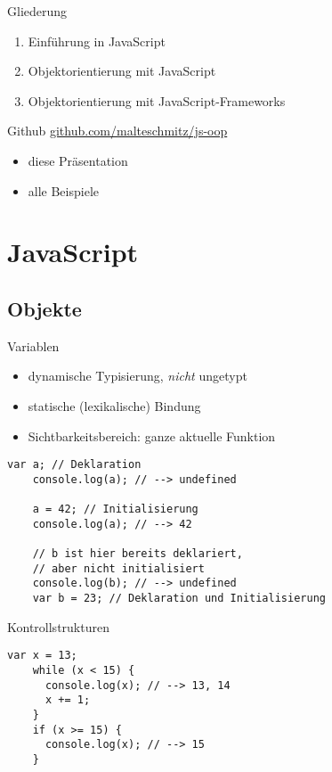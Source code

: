 \begin{frame}{Gliederung}
  \begin{enumerate}[{Teil} I]
    \item Einführung in JavaScript
    \item Objektorientierung mit JavaScript
    \item Objektorientierung mit JavaScript-Frameworks
  \end{enumerate}
\end{frame}

\begin{frame}{Github}
  \url{github.com/malteschmitz/js-oop}
  \begin{itemize}
    \item diese Präsentation
    \item alle Beispiele
  \end{itemize}
\end{frame}

\section{JavaScript}

\subsection{Objekte}

\begin{frame}[fragile]{Variablen}
  \begin{itemize}
    \item dynamische Typisierung, \emph{nicht} ungetypt
    \item statische (lexikalische) Bindung
    \item Sichtbarkeitsbereich: ganze aktuelle Funktion
  \end{itemize}
  
  \begin{lstlisting}[gobble=4]
    var a; // Deklaration
    console.log(a); // --> undefined
    
    a = 42; // Initialisierung
    console.log(a); // --> 42
    
    // b ist hier bereits deklariert,
    // aber nicht initialisiert
    console.log(b); // --> undefined
    var b = 23; // Deklaration und Initialisierung
  \end{lstlisting}  
\end{frame}

\begin{frame}[fragile]{Kontrollstrukturen}
  \begin{lstlisting}[gobble=4]
    var x = 13;
    while (x < 15) {
      console.log(x); // --> 13, 14
      x += 1;
    }
    if (x >= 15) {
      console.log(x); // --> 15
    }
  \end{lstlisting}
\end{frame}

